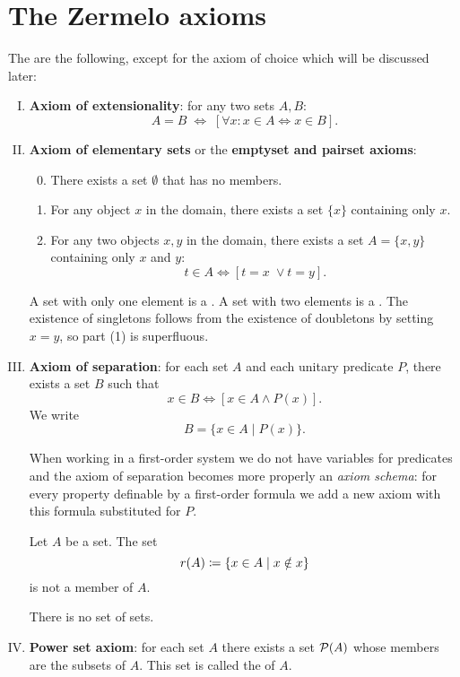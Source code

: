 \section{The Zermelo axioms}
The  are the following, except for the axiom of choice which will be discussed later:
\begin{enumerate}[(I)]
\item \textbf{Axiom of extensionality}: for any two sets $A,B$:
\[ A=B \;\iff\; \left[\forall x:x\in A\iff x\in B\right]. \]
\item \textbf{Axiom of elementary sets} or the \textbf{emptyset and pairset axioms}:
\begin{enumerate}[(1)] \setcounter{enumii}{-1}
\item There exists a set $\emptyset$ that has no members.
\item For any object $x$ in the domain, there exists a set $\{x\}$ containing only $x$.
\item For any two objects $x,y$ in the domain, there exists a set $A = \{x,y\}$ containing only $x$ and $y$:
\[ t\in A \iff [t=x\;\lor t=y]. \]
\end{enumerate}
\begin{note}
A set with only one element is a . A set with two elements is a . The existence of singletons follows from the existence of doubletons by setting $x=y$, so part (1) is superfluous.
\end{note}
\item \textbf{Axiom of separation}: for each set $A$ and each unitary predicate $P$, there exists a set $B$ such that
\[ x\in B \iff [x\in A \land P(x)]. \]
We write
\[ B = \{x\in A\;|\; P(x)\}. \]
\begin{note}
When working in a first-order system we do not have variables for predicates and the axiom of separation becomes more properly an \emph{axiom schema}: for every property definable by a first-order formula we add a new axiom with this formula substituted for $P$.
\end{note}
\begin{note}
\begin{proposition}
Let $A$ be a set. The set
\[ r(A) \coloneqq \{ x\in A\;|\; x\notin x \} \]
is not a member of $A$.
\end{proposition}
\begin{corollary}
There is no set of sets.
\end{corollary}
\end{note}
\item \textbf{Power set axiom}: for each set $A$ there exists a set $\operatorname{\mathcal{P}}(A)$ whose members are the subsets of $A$. This set is called the  of $A$.

\end{enumerate}
